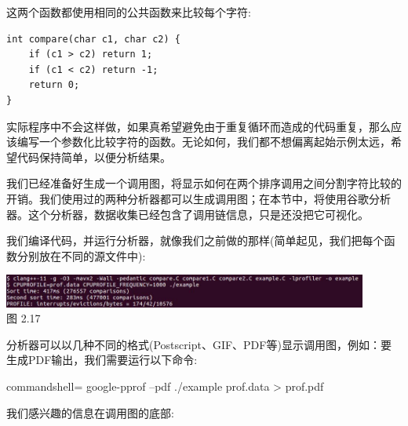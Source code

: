 这两个函数都使用相同的公共函数来比较每个字符:

\begin{lstlisting}[style=styleCXX]
int compare(char c1, char c2) {
	if (c1 > c2) return 1;
	if (c1 < c2) return -1;
	return 0;
}
\end{lstlisting}

实际程序中不会这样做，如果真希望避免由于重复循环而造成的代码重复，那么应该编写一个参数化比较字符的函数。无论如何，我们都不想偏离起始示例太远，希望代码保持简单，以便分析结果。

我们已经准备好生成一个调用图，将显示如何在两个排序调用之间分割字符比较的开销。我们使用过的两种分析器都可以生成调用图；在本节中，将使用谷歌分析器。这个分析器，数据收集已经包含了调用链信息，只是还没把它可视化。

我们编译代码，并运行分析器，就像我们之前做的那样(简单起见，我们把每个函数分别放在不同的源文件中):

\begin{center}
\includegraphics[width=0.9\textwidth]{content/1/chapter2/images/17.jpg}\\
图 2.17
\end{center}

分析器可以以几种不同的格式(Postscript、GIF、PDF等)显示调用图，例如：要生成PDF输出，我们需要运行以下命令:

\begin{tcblisting}{commandshell={}}
google-pprof --pdf ./example prof.data > prof.pdf
\end{tcblisting}

我们感兴趣的信息在调用图的底部:

